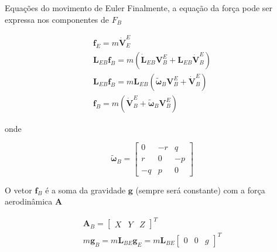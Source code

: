 \documentclass{beamer}
\newcommand{\jindent}{\justifying\setlength{\parindent}{1.5em}}
\begin{document}

\begin{frame}{Equações do movimento de Euler}
    Finalmente, a equação da força pode ser expressa nos componentes de $F_B$

    \begin{gather*}
        \mathbf f_E = m \dot{\mathbf V}_E^E \\
        \mathbf L_{EB} \mathbf f_B = m (\dot{\mathbf L}_{EB} \mathbf V_B^E + \mathbf L_{EB} \dot{\mathbf V}_B^E)\\
        \mathbf L_{EB} \mathbf f_B = m \mathbf L_{EB} ( \tilde{\boldsymbol{\omega}}_B \mathbf V_B^E + \dot{\mathbf V}_B^E )\\
        \mathbf f_B = m (\dot{\mathbf V}_B^E + \tilde{\boldsymbol{\omega}}_B \mathbf V_B^E)
    \end{gather*}

    \justifying
    onde

    \begin{equation*}
        \tilde{\boldsymbol{\omega}}_B =
        \begin{bmatrix}
        0 & -r & q \\
        r & 0 & -p \\
        -q & p & 0
        \end{bmatrix}
    \end{equation*}

    \jindent
    O vetor $\mathbf f_B$ é a soma da gravidade $\mathbf g$ (sempre será constante) com a força aerodinâmica $\mathbf A$

    \begin{gather*}
        \mathbf A_B =
            \begin{bmatrix} X & Y & Z \end{bmatrix}^T \\
        m \mathbf g_B = m \mathbf L_{BE} \mathbf g_E = m \mathbf L_{BE}
             \begin{bmatrix} 0 & 0 & g \end{bmatrix}^T
    \end{gather*}
\end{frame}
\end{document}

